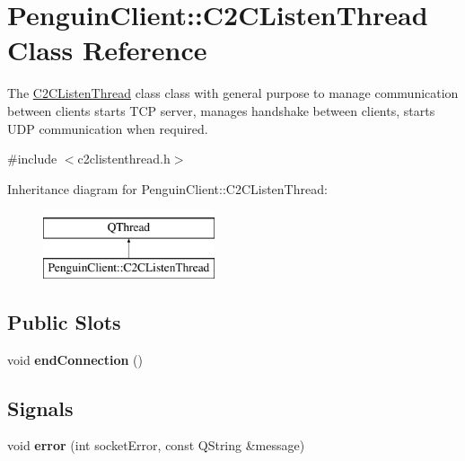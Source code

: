 \hypertarget{classPenguinClient_1_1C2CListenThread}{\section{Penguin\-Client\-:\-:C2\-C\-Listen\-Thread Class Reference}
\label{classPenguinClient_1_1C2CListenThread}
}


The \hyperlink{classPenguinClient_1_1C2CListenThread}{C2\-C\-Listen\-Thread} class class with general purpose to manage communication between clients starts T\-C\-P server, manages handshake between clients, starts U\-D\-P communication when required.  




{\ttfamily \#include $<$c2clistenthread.\-h$>$}

Inheritance diagram for Penguin\-Client\-:\-:C2\-C\-Listen\-Thread\-:\begin{figure}[H]
\begin{center}
\leavevmode
\includegraphics[height=2.000000cm]{classPenguinClient_1_1C2CListenThread}
\end{center}
\end{figure}
\subsection*{Public Slots}
\begin{DoxyCompactItemize}
\item 
\hypertarget{classPenguinClient_1_1C2CListenThread_a38a97a242e5915c5c6c22bcf04ef964c}{void {\bfseries end\-Connection} ()}\label{classPenguinClient_1_1C2CListenThread_a38a97a242e5915c5c6c22bcf04ef964c}

\end{DoxyCompactItemize}
\subsection*{Signals}
\begin{DoxyCompactItemize}
\item 
\hypertarget{classPenguinClient_1_1C2CListenThread_aad8292f0535d5fe879fb1120337dc91f}{void {\bfseries error} (int socket\-Error, const Q\-String \&message)}\label{classPenguinClient_1_1C2CListenThread_aad8292f0535d5fe879fb1120337dc91f}

\end{DoxyCompactItemize}
